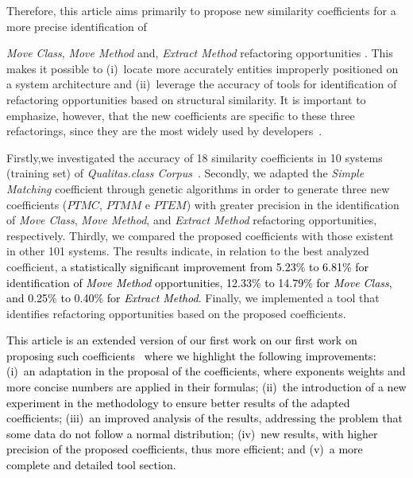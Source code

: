 \documentclass[smallextended,natbib]{svjour3}
\begin{document}
Therefore, this article aims primarily to propose new similarity coefficients for a more precise identification of {\textit{Move Class}, \textit{Move Method} and, \textit{Extract Method} refactoring opportunities .
This makes it possible to (i)~locate more accurately entities improperly positioned on a system architecture and (ii)~leverage the accuracy of tools for identification of refactoring opportunities based on structural similarity. It is important to emphasize, however, that the new coefficients are specific to these three refactorings, since they are the most widely used by developers~\citep{silva2016we}.

Firstly,we investigated the accuracy of 18 similarity coefficients in 10 systems (training set) of \textit{Qualitas.class Corpus}~\citep{qc}.
%
Secondly, we adapted the \textit{Simple Matching} coefficient through genetic algorithms in order to generate three new coefficients ($PTMC$, $PTMM$ e $PTEM$) with greater precision in the identification of \textit{Move Class}, \textit{Move Method}, and \textit{Extract Method} refactoring opportunities, respectively. 
%
Thirdly, we compared the proposed coefficients with those existent in other 101 systems. The results indicate, in relation to the best analyzed coefficient, \textcolor{black}{a statistically significant improvement from 5.23\% to 6.81\% for identification of \textit{Move Method} opportunities, 12.33\% to 14.79\% for \textit{Move Class}, and 0.25\% to 0.40\% for \textit{Extract Method}}. 
Finally, we implemented a tool that identifies refactoring opportunities based on the proposed coefficients.

\textcolor{black}{This article is an extended version of our first work on our first work on proposing such coefficients~\citep{2017_sbcars} where we highlight the following improvements: (i)~an adaptation in the proposal of the coefficients, where exponents weights and more concise numbers are applied in their formulas; (ii)~the introduction of a new experiment in the methodology to ensure better results of the adapted coefficients; (iii)~an improved analysis of the results, addressing the problem that some data do not follow a normal distribution; (iv)~new results, with higher precision of the proposed coefficients, thus more efficient; and (v)~a more complete and detailed tool section.}

}
\end{document}
